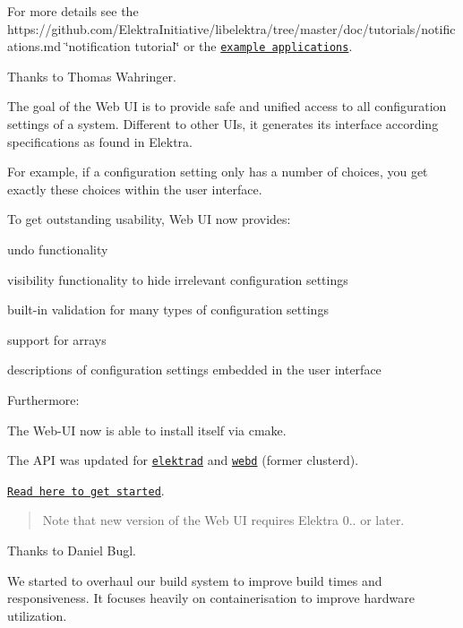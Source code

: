 For more details see the https\+://github.com/\+Elektra\+Initiative/libelektra/tree/master/doc/tutorials/notifications.\+md \char`\"{}notification tutorial\char`\"{} or the \href{https://master.libelektra.org/examples}{\tt example applications}.

Thanks to Thomas Wahringer.

The goal of the Web UI is to provide safe and unified access to all configuration settings of a system. Different to other U\+Is, it generates its interface according specifications as found in Elektra.

For example, if a configuration setting only has a number of choices, you get exactly these choices within the user interface.

To get outstanding usability, Web UI now provides\+:


\begin{DoxyItemize}
\item undo functionality
\item visibility functionality to hide irrelevant configuration settings
\item built-\/in validation for many types of configuration settings
\item support for arrays
\item descriptions of configuration settings embedded in the user interface
\end{DoxyItemize}

Furthermore\+:


\begin{DoxyItemize}
\item The Web-\/\+UI now is able to install itself via cmake.
\item The A\+PI was updated for \href{https://master.libelektra.org/doc/api_blueprints/elektrad.apib}{\tt elektrad} and \href{https://master.libelektra.org/doc/api_blueprints/webd.apib}{\tt webd} (former clusterd).
\end{DoxyItemize}

\href{https://www.libelektra.org/tools/web}{\tt Read here to get started}.

\begin{quote}
Note that new version of the Web UI requires Elektra 0.. or later. \end{quote}


Thanks to Daniel Bugl.

We started to overhaul our build system to improve build times and responsiveness. It focuses heavily on containerisation to improve hardware utilization.

